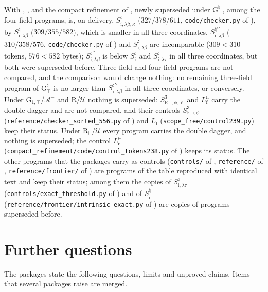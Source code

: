 With , ,  and the compact refinement of
, newly superseded under G$^{\natural}_{\top}$, among the four-field programs, is, on
delivery, $S^{\natural}_{\mathrm{i},\lambda\beta,\kappa}$ ($327/378/611$, \texttt{code/checker.py} of
), by $S^{\natural}_{\mathrm{i},\lambda\beta}$ ($309/355/582$), which is smaller in all
three coordinates. $S^{\natural\prime\prime}_{\mathrm{i},\lambda\beta}$ ($310/358/576$,
\texttt{code/checker.py} of ) and $S^{\natural}_{\mathrm{i},\lambda\beta}$ are
incomparable ($309<310$ tokens, $576<582$ bytes); $S^{\natural\prime\prime}_{\mathrm{i},\lambda\beta}$ is
below $S^{\natural}_{\mathrm i}$ and $S^{\natural}_{\mathrm{i},\lambda\tau}$ in all three coordinates, but
both were superseded before. Three-field and four-field programs are not compared, and the comparison would
change nothing: no remaining three-field program of G$^{\natural}_{\top}$ is no larger than
$S^{\natural\prime\prime}_{\mathrm{i},\lambda\beta}$ in all three coordinates, or conversely. Under
G$_{1,\top}$/$\mathcal A^{-}$ and R/$\mathcal U$ nothing is superseded: $S^{3}_{\mathrm{E,i},\phi,\ell}$ and
$L^{\mathrm n}_{\mathrm f}$ carry the double dagger and are not compared, and their controls
$S^{3}_{\mathrm{E,i},\phi}$ (\texttt{reference/checker\_sorted\_556.py} of ) and
$L_{\mathrm f}$ (\texttt{scope\_free/control239.py}) keep their status. Under R$_{\vdash}$/$\mathcal U$
every program carries the double dagger, and nothing is superseded; the control $L^{\vdash}_{\mathrm c}$
(\texttt{compact\_refinement/code/control\_tokens238.py} of ) keeps its status. The
other programs that the packages carry as controls (\texttt{controls/} of ,
\texttt{reference/} of , \texttt{reference/frontier/} of ) are programs
of the table reproduced with identical text and keep their status; among them the copies of
$S^{\natural}_{\mathrm{i},\lambda\tau}$ (\texttt{controls/exact\_threshold.py} of )
and of $S^{\natural}_{\mathrm i}$ (\texttt{reference/frontier/intrinsic\_exact.py} of ) are
copies of programs superseded before.

\section{Further questions}\label{cert:sec:questions}

The packages state the following questions, limits and unproved claims. Items
that several packages raise are merged.

